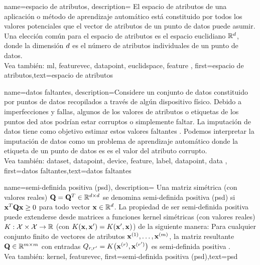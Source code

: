 {name={espacio de atributos},
	description={
		El espacio de atributos de una aplicación o método de aprendizaje automático
		está constituido por todos los valores potenciales que el vector de atributos de un punto de datos puede asumir.
		Una elección común para el espacio de atributos es el espacio euclidiano $\mathbb{R}^{d}$, 
		donde la dimensión $d$ es el número de atributos individuales de un punto de datos.
		\\
		Vea también: \gls{ml}, \gls{featurevec}, \gls{datapoint}, \gls{euclidspace}, \gls{feature} },
	first={espacio de atributos},text={espacio de atributos}  
}


{name={datos faltantes},
	description={Considere un conjunto de datos constituido por puntos de datos recopilados  
		a través de algún dispositivo físico. Debido a imperfecciones y fallas, algunos de los valores de atributos
		o etiquetas de los puntos ded atos podrían estar corruptos o simplemente faltar.  
		La imputación de datos tiene como objetivo estimar estos valores faltantes \cite{Abayomi2008DiagnosticsFM}. 
		Podemos interpretar la imputación de datos como un problema de aprendizaje automático donde la etiqueta de un punto de datos es 
		es el valor del atributo corrupto. 
		\\
		Vea también:  \gls{dataset}, \gls{datapoint}, \gls{device}, \gls{feature}, \gls{label}, \gls{datapoint}, \Gls{data} },
	first={datos faltantes},text={datos faltantes}  
}


{name={semi-definida positiva (psd)},
    description=
    {Una  matriz simétrica (con valores reales) $\mathbf{Q} = \mathbf{Q}^{T} \in \mathbb{R}^{d \times d}$ 
	se denomina semi-definida positiva (psd) si ${\bf x}^{T} \mathbf{Q} {\bf x} \geq 0$ para todo vector ${\bf x} \in \mathbb{R}^{d}$. 
	La propiedad de ser semi-definida positiva puede extenderse desde matrices a funciones kernel simétricas (con valores reales) 
	$K: \mathcal{X} \times \mathcal{X} \rightarrow \mathbb{R}$ 
	(con $K({\bf x},{\bf x}') = K({\bf x}',{\bf x})$)
	de la siguiente manera: Para cualquier conjunto finito de vectores de atributos ${\bf x}^{(1)},\dots,{\bf x}^{(m)}$, 
	la matriz resultante $\mathbf{Q} \in \mathbb{R}^{m \times m}$ con 
	entradas $Q_{r,r'} = K\big({\bf x}^{(r)},{\bf x}^{(r')}\big)$ 
	es semi-definida positiva \cite{LearningKernelsBook}.
	\\
		Vea también: \gls{kernel}, \gls{featurevec}},
    first={semi-definida positiva (psd)},text={psd}  
}

